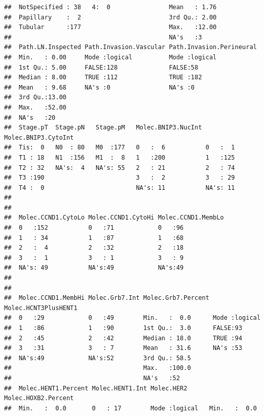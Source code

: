 \documentclass{article}\usepackage[]{graphicx}\usepackage[]{color}
\makeatletter
\newenvironment{kframe}{%
 \def\at@end@of@kframe{}%
 \ifinner\ifhmode%
  \def\at@end@of@kframe{\end{minipage}}%
  \begin{minipage}{\columnwidth}%
 \fi\fi%
 \def\FrameCommand##1{\hskip\@totalleftmargin \hskip-\fboxsep
 \colorbox{shadecolor}{##1}\hskip-\fboxsep
     \hskip-\linewidth \hskip-\@totalleftmargin \hskip\columnwidth}%
 \MakeFramed {\advance\hsize-\width
   \@totalleftmargin\z@ \linewidth\hsize
   \@setminipage}}%
 {\par\unskip\endMakeFramed%
 \at@end@of@kframe}
\newenvironment{knitrout}{}{} %
\makeatother
\begin{document}
\begin{knitrout}
\begin{kframe}
\begin{verbatim}
##  NotSpecified : 38   4:  0                Mean   : 1.76   
##  Papillary    :  2                        3rd Qu.: 2.00   
##  Tubular      :177                        Max.   :12.00   
##                                           NA's   :3       
##  Path.LN.Inspected Path.Invasion.Vascular Path.Invasion.Perineural
##  Min.   : 0.00     Mode :logical          Mode :logical           
##  1st Qu.: 5.00     FALSE:128              FALSE:58                
##  Median : 8.00     TRUE :112              TRUE :182               
##  Mean   : 9.68     NA's :0                NA's :0                 
##  3rd Qu.:13.00                                                    
##  Max.   :52.00                                                    
##  NA's   :20                                                       
##  Stage.pT  Stage.pN   Stage.pM   Molec.BNIP3.NucInt Molec.BNIP3.CytoInt
##  Tis:  0   N0  : 80   M0  :177   0   :  6           0   :  1           
##  T1 : 18   N1  :156   M1  :  8   1   :200           1   :125           
##  T2 : 32   NA's:  4   NA's: 55   2   : 21           2   : 74           
##  T3 :190                         3   :  2           3   : 29           
##  T4 :  0                         NA's: 11           NA's: 11           
##                                                                        
##                                                                        
##  Molec.CCND1.CytoLo Molec.CCND1.CytoHi Molec.CCND1.MembLo
##  0   :152           0   :71            0   :96           
##  1   : 34           1   :87            1   :68           
##  2   :  4           2   :32            2   :18           
##  3   :  1           3   : 1            3   : 9           
##  NA's: 49           NA's:49            NA's:49           
##                                                          
##                                                          
##  Molec.CCND1.MembHi Molec.Grb7.Int Molec.Grb7.Percent Molec.HCNT3PlusHENT1
##  0   :29            0   :49        Min.   :  0.0      Mode :logical       
##  1   :86            1   :90        1st Qu.:  3.0      FALSE:93            
##  2   :45            2   :42        Median : 18.0      TRUE :94            
##  3   :31            3   : 7        Mean   : 31.6      NA's :53            
##  NA's:49            NA's:52        3rd Qu.: 58.5                          
##                                    Max.   :100.0                          
##                                    NA's   :52                             
##  Molec.HENT1.Percent Molec.HENT1.Int Molec.HER2      Molec.HOXB2.Percent
##  Min.   :  0.0       0   : 17        Mode :logical   Min.   :  0.0      

\end{verbatim}
\end{kframe}
\end{knitrout}
\end{document}
